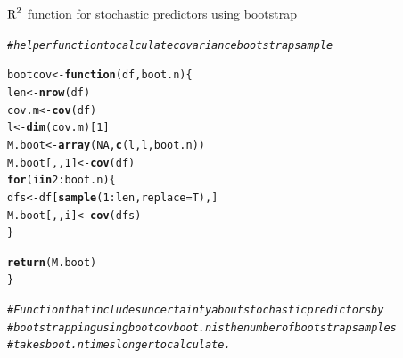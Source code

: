 \documentclass[11pt,a4paper,twoside]{book}\usepackage[]{graphicx}\usepackage[]{color}
\makeatletter
\newcommand{\hlnum}[1]{\textcolor[rgb]{0.686,0.059,0.569}{#1}}%
\newcommand{\hlcom}[1]{\textcolor[rgb]{0.678,0.584,0.686}{\textit{#1}}}%
\newcommand{\hlopt}[1]{\textcolor[rgb]{0,0,0}{#1}}%
\newcommand{\hlstd}[1]{\textcolor[rgb]{0.345,0.345,0.345}{#1}}%
\newcommand{\hlkwa}[1]{\textcolor[rgb]{0.161,0.373,0.58}{\textbf{#1}}}%
\newcommand{\hlkwb}[1]{\textcolor[rgb]{0.69,0.353,0.396}{#1}}%
\newcommand{\hlkwc}[1]{\textcolor[rgb]{0.333,0.667,0.333}{#1}}%
\newcommand{\hlkwd}[1]{\textcolor[rgb]{0.737,0.353,0.396}{\textbf{#1}}}%
\newenvironment{kframe}{%
 \def\at@end@of@kframe{}%
 \ifinner\ifhmode%
  \def\at@end@of@kframe{\end{minipage}}%
  \begin{minipage}{\columnwidth}%
 \fi\fi%
 \def\FrameCommand##1{\hskip\@totalleftmargin \hskip-\fboxsep
 \colorbox{shadecolor}{##1}\hskip-\fboxsep
     \hskip-\linewidth \hskip-\@totalleftmargin \hskip\columnwidth}%
 \MakeFramed {\advance\hsize-\width
   \@totalleftmargin\z@ \linewidth\hsize
   \@setminipage}}%
 {\par\unskip\endMakeFramed%
 \at@end@of@kframe}
\newenvironment{knitrout}{}{} %
\makeatother
\begin{document}
\begin{codeenv}
\caption{$\text{R}^2$ function for stochastic predictors using bootstrap}\label{r03:LMG.boot}
\begin{knitrout}
\color{fgcolor}\begin{kframe}
\begin{alltt}
\hlcom{# helper function to calculate covariance bootstrap sample}

\hlstd{bootcov} \hlkwb{<-} \hlkwa{function}\hlstd{(}\hlkwc{df}\hlstd{,} \hlkwc{boot.n}\hlstd{) \{}
    \hlstd{len} \hlkwb{<-} \hlkwd{nrow}\hlstd{(df)}
    \hlstd{cov.m} \hlkwb{<-} \hlkwd{cov}\hlstd{(df)}
    \hlstd{l} \hlkwb{<-} \hlkwd{dim}\hlstd{(cov.m)[}\hlnum{1}\hlstd{]}
    \hlstd{M.boot} \hlkwb{<-} \hlkwd{array}\hlstd{(}\hlnum{NA}\hlstd{,} \hlkwd{c}\hlstd{(l, l, boot.n))}
    \hlstd{M.boot[, ,} \hlnum{1}\hlstd{]} \hlkwb{<-} \hlkwd{cov}\hlstd{(df)}
    \hlkwa{for} \hlstd{(i} \hlkwa{in} \hlnum{2}\hlopt{:}\hlstd{boot.n) \{}
        \hlstd{dfs} \hlkwb{<-} \hlstd{df[}\hlkwd{sample}\hlstd{(}\hlnum{1}\hlopt{:}\hlstd{len,} \hlkwc{replace} \hlstd{= T), ]}
        \hlstd{M.boot[, , i]} \hlkwb{<-} \hlkwd{cov}\hlstd{(dfs)}
    \hlstd{\}}

    \hlkwd{return}\hlstd{(M.boot)}
\hlstd{\}}


\hlcom{# Function that includes uncertainty about stochastic predictors by}
\hlcom{# bootstrapping using bootcov boot.n is the number of bootstrap samples}
\hlcom{# takes boot.n times longer to calculate.}


\end{alltt}
\end{kframe}
\end{knitrout}
\end{codeenv}
\end{document}
